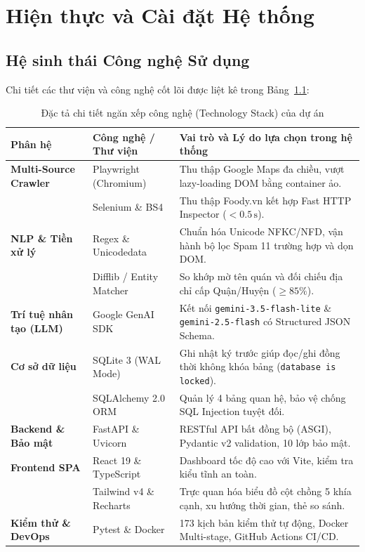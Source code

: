 \chapter{Hiện thực và Cài đặt Hệ thống}

\section{Hệ sinh thái Công nghệ Sử dụng}
Chi tiết các thư viện và công nghệ cốt lõi được liệt kê trong Bảng~\ref{tab:tech_stack}:

\begin{table}[H]
\centering
\caption{Đặc tả chi tiết ngăn xếp công nghệ (Technology Stack) của dự án}
\label{tab:tech_stack}
\vspace{0.15cm}
\footnotesize
\begin{tabularx}{\textwidth}{l l X}
\toprule
\rowcolor{blue!8}
\textbf{Phân hệ} & \textbf{Công nghệ / Thư viện} & \textbf{Vai trò và Lý do lựa chọn trong hệ thống} \\
\midrule
\textbf{Multi-Source Crawler} & Playwright (Chromium) & Thu thập Google Maps đa chiều, vượt lazy-loading DOM bằng container ảo. \\
 & Selenium \& BS4 & Thu thập Foody.vn kết hợp Fast HTTP Inspector ($<0.5\,\mathrm{s}$). \\
\midrule
\textbf{NLP \& Tiền xử lý} & Regex \& Unicodedata & Chuẩn hóa Unicode NFKC/NFD, vận hành bộ lọc Spam 11 trường hợp và dọn DOM. \\
 & Difflib / Entity Matcher & So khớp mờ tên quán và đối chiếu địa chỉ cấp Quận/Huyện ($\ge 85\%$). \\
\midrule
\textbf{Trí tuệ nhân tạo (LLM)} & Google GenAI SDK~\cite{google2025} & Kết nối \texttt{gemini-3.5-flash-lite} \& \texttt{gemini-2.5-flash} có Structured JSON Schema. \\
\midrule
\textbf{Cơ sở dữ liệu} & SQLite 3 (WAL Mode)~\cite{hipp2024} & Ghi nhật ký trước giúp đọc/ghi đồng thời không khóa bảng (\texttt{database is locked}). \\
 & SQLAlchemy 2.0 ORM & Quản lý 4 bảng quan hệ, bảo vệ chống SQL Injection tuyệt đối. \\
\midrule
\textbf{Backend \& Bảo mật} & FastAPI \& Uvicorn~\cite{ramirez2025} & RESTful API bất đồng bộ (ASGI), Pydantic v2 validation, 10 lớp bảo mật. \\
\midrule
\textbf{Frontend SPA} & React 19 \& TypeScript & Dashboard tốc độ cao với Vite, kiểm tra kiểu tĩnh an toàn. \\
 & Tailwind v4 \& Recharts & Trực quan hóa biểu đồ cột chồng 5 khía cạnh, xu hướng thời gian, thẻ so sánh. \\
\midrule
\textbf{Kiểm thử \& DevOps} & Pytest \& Docker & 173 kịch bản kiểm thử tự động, Docker Multi-stage, GitHub Actions CI/CD. \\
\bottomrule
\end{tabularx}
\end{table}

